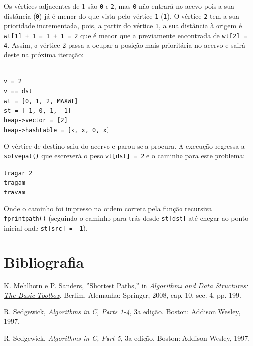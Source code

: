\documentclass[portuguese, a4paper]{article}
\newcommand\tu[0]{\textunderscore}
\begin{document}
	\par
	Os vértices adjacentes de 1 são \texttt{0} e \texttt{2}, mas \texttt{0} não
	entrará no acevo pois a sua distância (\texttt{0}) já é menor do que vista
	pelo vértice \texttt{1} (\texttt{1}). O vértice \texttt{2} tem a sua
	prioridade incrementada, pois, a partir do vértice \texttt{1}, a sua
	distância à origem é \texttt{wt[1] + 1 = 1 + 1 = 2} que é menor que a
	previamente encontrada de \texttt{wt[2] = 4}. Assim, o vértice 2 passa a
	ocupar a posição mais prioritária no acervo e sairá deste na próxima
	iteração:
	\begin{center}
		\begin{minipage}{0.45\linewidth}
		\texttt{\\
			v = 2 \\
			v == dst \\
			wt = [0, 1, 2, MAX\tu WT] \\
			st = [-1, 0, 1, -1] \\
			heap->vector = [2] \\
			heap->hash\tu table = [x, x, 0, x] \\}
		\end{minipage}
		\hspace{0.05\linewidth}
	\end{center}
	\par
	O vértice de destino saiu do acervo e parou-se a procura. A execução
	regressa a \texttt{solve\tu pal()} que escreverá o peso \texttt{wt[dst] = 2}
	e o caminho para este problema:
	\begin{center}
	\begin{minipage}{0.15\linewidth}
		\texttt{tragar 2 \\
				tragam \\
				travam}
	\end{minipage}
	\end{center}
	\par
	Onde o caminho foi impresso na ordem correta pela função recursiva
	\texttt{fprint\tu path()} (seguindo o caminho para trás desde
	\texttt{st[dst]} até chegar ao ponto inicial onde \texttt{st[src] = -1}).

\section{Bibliografia}
	\begin{thebibliography}{9}
		K. Mehlhorn e P. Sanders, ''Shortest Paths,'' in
		\href{http://people.mpi-inf.mpg.de/~mehlhorn/ftp/Toolbox/ShortestPaths.pdf}{\emph{Algorithms
		and Data Structures: The Basic Toolbox}}. Berlim, Alemanha: Springer,
		2008, cap. 10, sec. 4, pp. 199.

		R. Sedgewick, \emph{Algorithms in C, Parts 1-4}, 3a edição. Boston:
		Addison Wesley, 1997.

		R. Sedgewick, \emph{Algorithms in C, Part 5}, 3a edição. Boston:
		Addison Wesley, 1997.
	\end{thebibliography}
\end{document}
